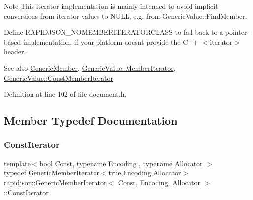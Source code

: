 \begin{DoxyNote}{Note}
This iterator implementation is mainly intended to avoid implicit conversions from iterator values to {\ttfamily N\+U\+LL}, e.\+g. from Generic\+Value\+::\+Find\+Member.

Define {\ttfamily R\+A\+P\+I\+D\+J\+S\+O\+N\+\_\+\+N\+O\+M\+E\+M\+B\+E\+R\+I\+T\+E\+R\+A\+T\+O\+R\+C\+L\+A\+SS} to fall back to a pointer-\/based implementation, if your platform doesn\textquotesingle{}t provide the C++ $<$iterator$>$ header.
\end{DoxyNote}
\begin{DoxySeeAlso}{See also}
\mbox{\hyperlink{structrapidjson_1_1_generic_member}{Generic\+Member}}, \mbox{\hyperlink{classrapidjson_1_1_generic_value_aca5596987335016c1a7c2a9467baf80b}{Generic\+Value\+::\+Member\+Iterator}}, \mbox{\hyperlink{classrapidjson_1_1_generic_value_a6cd2b09795c48d2892bebc0ae350d51f}{Generic\+Value\+::\+Const\+Member\+Iterator}} 
\end{DoxySeeAlso}


Definition at line 102 of file document.\+h.



\subsection{Member Typedef Documentation}
\mbox{\label{classrapidjson_1_1_generic_member_iterator_a61b9a9ba8a5917d90406532f104605cc}} 
\subsubsection{\texorpdfstring{ConstIterator}{ConstIterator}}
{\footnotesize\ttfamily template$<$bool Const, typename Encoding , typename Allocator $>$ \\
typedef \mbox{\hyperlink{classrapidjson_1_1_generic_member_iterator}{Generic\+Member\+Iterator}}$<$true,\mbox{\hyperlink{classrapidjson_1_1_encoding}{Encoding}},\mbox{\hyperlink{classrapidjson_1_1_allocator}{Allocator}}$>$ \mbox{\hyperlink{classrapidjson_1_1_generic_member_iterator}{rapidjson\+::\+Generic\+Member\+Iterator}}$<$ Const, \mbox{\hyperlink{classrapidjson_1_1_encoding}{Encoding}}, \mbox{\hyperlink{classrapidjson_1_1_allocator}{Allocator}} $>$\+::\mbox{\hyperlink{classrapidjson_1_1_generic_member_iterator_a61b9a9ba8a5917d90406532f104605cc}{Const\+Iterator}}}



